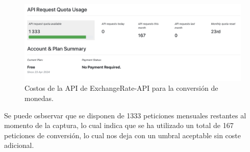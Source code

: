 \begin{figure}[H]
    \centering
    \includegraphics[width=1.0\textwidth]{imagenes/05-implementacion/costos/costos-exchangerate-api.png}
    \caption{Costos de la API de ExchangeRate-API para la conversión de monedas.}
    \label{fig:costos-exchangerate-api}
\end{figure}

Se puede osbservar que se disponen de 1333 peticiones mensuales restantes al momento
de la captura, lo cual indica que se ha utilizado un total de 167 peticiones de
conversión, lo cual nos deja con un umbral aceptable sin coste adicional.

